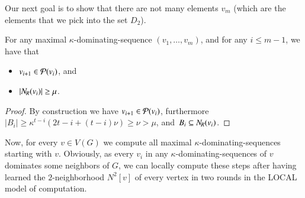 Our next goal is to show that there are not many elements $v_m$
(which are the elements that we pick into the set $D_2$).


%
%
%
%
%

\begin{lemma}\label{lem:shape-sequences}
  For any maximal $\kappa$-dominating-sequence $(v_1,\ldots,v_m)$,
  and for any $i\le m-1$, we have that
  \begin{itemize}
    \item $v_{i+1}\in \mathcal{P}(v_i)$, and
    \item $|N_{\hspace{-1pt}R}(v_i)|\ge \mu$.
  \end{itemize}
\end{lemma}
\begin{proof}
  By construction we have $v_{i+1}\in \mathcal{P}(v_i)$, furthermore
  $|B_{i}|\geq \kappa^{t -i}(2t -i+(t -i)\nu) \ge \nu >\mu$,
  and~$B_i\subseteq N_{\hspace{-1pt}R}(v_i)$.
\end{proof}

Now, for every $v\in V(G)$ we compute all maximal $\kappa$-dominating-sequences
starting with $v$.
Obviously, as every $v_i$ in any $\kappa$-dominating-sequences of $v$ dominates some
neighbors of $G$, we can locally compute these steps after having
learned the $2$-neighborhood $N^2[v]$ of every vertex in two rounds
in the LOCAL model of computation.

